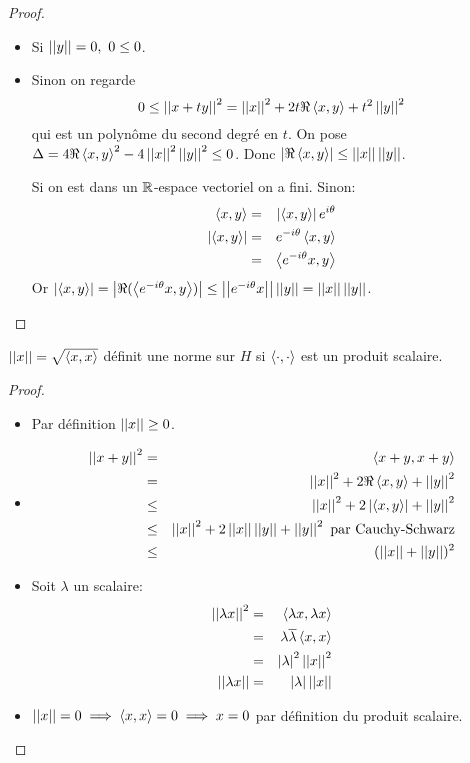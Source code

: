 \begin{proof}
	\begin{itemize}
		\item Si $\norm y = 0, \ 0 \leq 0$.
		\item Sinon on regarde
		      $$ 0 \leq \norm{x + ty}^2 = \norm{x}^2 + 2t\Re \sprod{x}{y} + t^2 \norm{y}^2 $$
		      qui est un polynôme du second degré en $t$.
		      On pose $\Delta = 4\Re \sprod{x}{y}^2 - 4\norm{x}^2\norm{y}^2 \leq 0$.
		      Donc $\abs{\Re \sprod{x}{y}} \leq \norm x \norm y$.

		      Si on est dans un $\R$-espace vectoriel on a fini. Sinon:
		      \begin{eqnarray*}
			      \sprod x y &=& \abs{\sprod x y} e^{i\theta} \\
			      \abs{\sprod x y} &=& e^{-i\theta} \sprod x y \\
			      &=&    \sprod {e^{-i\theta} x} y
		      \end{eqnarray*}
		      Or $\abs{\sprod x y} = \abs {\Re ( \sprod {e^{-i\theta} x} y )} \leq \norm {e^{-i\theta} x} \norm y = \norm x \norm y$.
	\end{itemize}
\end{proof}


\begin{coro}
	$\norm{x} = \sqrt{\sprod{x}{x}}$ définit une norme sur $H$ si $\sprod{\cdot}{\cdot}$ est un produit scalaire.
\end{coro}

\begin{proof}
	\begin{itemize}
		\item Par définition $\norm{x} \geq 0$.
		\item \begin{eqnarray*}
			      \norm{x + y}^2 &=& \sprod{x+y}{x+y} \\
			      &=&\norm x^2 + 2\Re \sprod{x}{y} + \norm{y}^2 \\
			      &\leq& \norm{x}^2 + 2\abs{\sprod{x}{y}} + \norm{y}^2 \\
			      &\leq& \norm{x}^2 + 2\norm{x}\norm{y} + \norm{y}^2 \text{ par Cauchy-Schwarz} \\
			      &\leq& (\norm{x} + \norm{y})^2
		      \end{eqnarray*}
		\item Soit $\lambda$ un scalaire:
		      \begin{eqnarray*}
			      \norm{\lambda x}^2 &=& \sprod{\lambda x}{\lambda x} \\
			      &=&\lambda \overline \lambda \sprod{x}{x} \\
			      &=& \abs{\lambda}^2 \norm{x}^2 \\
			      \norm{\lambda x} &=& \abs{\lambda} \norm{x}
		      \end{eqnarray*}
		\item $\norm{x} = 0 \implies \sprod{x}{x} = 0 \implies x = 0$ par définition du produit scalaire.
	\end{itemize}
\end{proof}


